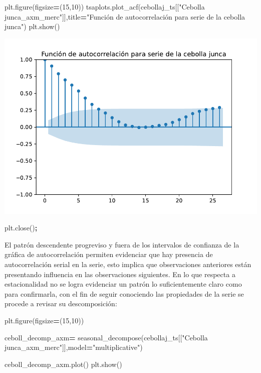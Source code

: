 \documentclass[
]{book}
\newenvironment{Shaded}{\begin{snugshade}}{\end{snugshade}}
\newcommand{\DecValTok}[1]{\textcolor[rgb]{0.00,0.00,0.81}{#1}}
\newcommand{\NormalTok}[1]{#1}
\newcommand{\OperatorTok}[1]{\textcolor[rgb]{0.81,0.36,0.00}{\textbf{#1}}}
\newcommand{\StringTok}[1]{\textcolor[rgb]{0.31,0.60,0.02}{#1}}
\begin{document}
\begin{Shaded}
\begin{Highlighting}[]

\NormalTok{plt.figure(figsize}\OperatorTok{=}\NormalTok{(}\DecValTok{15}\NormalTok{,}\DecValTok{10}\NormalTok{))}
\NormalTok{tsaplots.plot\_acf(cebollaj\_ts[[}\StringTok{"Cebolla junca\_axm\_merc"}\NormalTok{]],title}\OperatorTok{=}\StringTok{"Función de autocorrelación para serie de la cebolla junca"}\NormalTok{)}
\NormalTok{plt.show()}
\end{Highlighting}
\end{Shaded}

\includegraphics{bookdown-demo_files/figure-latex/unnamed-chunk-57-19.pdf}

\begin{Shaded}
\begin{Highlighting}[]
\NormalTok{plt.close()}\OperatorTok{;}
\end{Highlighting}
\end{Shaded}

El patrón descendente progreviso y fuera de los intervalos de confianza de la gráfica de autocorrelación permiten evidenciar que hay presencia de autocorrelación serial en la serie, esto implica que observaciones anteriores están presentando influencia en las observaciones siguientes. En lo que respecta a estacionalidad no se logra evidenciar un patrón lo suficientemente claro como para confirmarla, con el fin de seguir conociendo las propiedades de la serie se procede a revisar su descomposición:

\begin{Shaded}
\begin{Highlighting}[]


\NormalTok{plt.figure(figsize}\OperatorTok{=}\NormalTok{(}\DecValTok{15}\NormalTok{,}\DecValTok{10}\NormalTok{))}

\NormalTok{ceboll\_decomp\_axm}\OperatorTok{=}\NormalTok{ seasonal\_decompose(cebollaj\_ts[[}\StringTok{"Cebolla junca\_axm\_merc"}\NormalTok{]],model}\OperatorTok{=}\StringTok{"multiplicative"}\NormalTok{)}

\NormalTok{ceboll\_decomp\_axm.plot()}
\NormalTok{plt.show()}
\end{Highlighting}
\end{Shaded}
\end{document}
